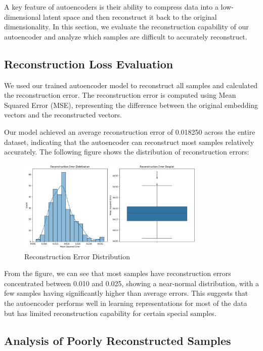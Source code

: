 \documentclass{article}
\begin{document}
A key feature of autoencoders is their ability to compress data into a low-dimensional latent space and then reconstruct it back to the original dimensionality. In this section, we evaluate the reconstruction capability of our autoencoder and analyze which samples are difficult to accurately reconstruct.

\subsection*{Reconstruction Loss Evaluation}

We used our trained autoencoder model to reconstruct all samples and calculated the reconstruction error. The reconstruction error is computed using Mean Squared Error (MSE), representing the difference between the original embedding vectors and the reconstructed vectors.


Our model achieved an average reconstruction error of 0.018250 across the entire dataset, indicating that the autoencoder can reconstruct most samples relatively accurately. The following figure shows the distribution of reconstruction errors:

\begin{figure}[h!]
\centering
\includegraphics[width=0.8\textwidth]{figs/reconstruction1.png}
\caption{Reconstruction Error Distribution}
\end{figure}

From the figure, we can see that most samples have reconstruction errors concentrated between 0.010 and 0.025, showing a near-normal distribution, with a few samples having significantly higher than average errors. This suggests that the autoencoder performs well in learning representations for most of the data but has limited reconstruction capability for certain special samples.

\subsection*{Analysis of Poorly Reconstructed Samples}
\end{document}
